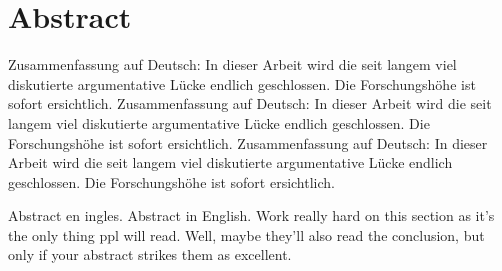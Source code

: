 \chapter*{Abstract}

Zusammenfassung auf Deutsch: In dieser Arbeit wird die seit langem viel diskutierte argumentative Lücke endlich geschlossen.
Die Forschungshöhe ist sofort ersichtlich.
Zusammenfassung auf Deutsch: In dieser Arbeit wird die seit langem viel diskutierte argumentative Lücke endlich geschlossen.
Die Forschungshöhe ist sofort ersichtlich.
Zusammenfassung auf Deutsch: In dieser Arbeit wird die seit langem viel diskutierte argumentative Lücke endlich geschlossen.
Die Forschungshöhe ist sofort ersichtlich.

\bigskip\bigskip

Abstract en ingles.
Abstract in English.
Work really hard on this section as it's the only thing ppl will read.
Well, maybe they'll also read the conclusion, but only if your abstract strikes them as excellent.

